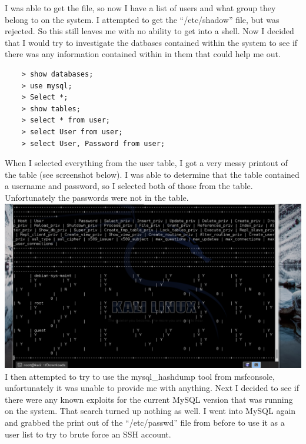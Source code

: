 \documentclass[12pt]{report}
\begin{document}
\newline
I was able to get the file, so now I have a list of users and what group they belong to on the system. I attempted to get the ``/etc/shadow'' file, but was rejected. So this still leaves me with no ability to get into a shell. Now I decided that I would try to investigate the datbases contained within the system to see if there was any information contained within in them that could help me out.
	\begin{verbatim}
	> show databases;
	> use mysql; 
	> Select *;
	> show tables;
	> select * from user;
	> select User from user;
	> select User, Password from user;
	\end{verbatim}
When I selected everything from the user table, I got a very messy printout of the table (see screenshot below). I was able to determine that the table contained a username and password, so I selected both of those from the table. Unfortunately the passwords were not in the table.\\
\includegraphics[scale=0.33, width=\linewidth]{weird_output.PNG}
\newline
I then attempted to try to use the mysql\_hashdump tool from msfconsole, unfortunately it was unable to provide me with anything. Next I decided to see if there were any known exploits for the current MySQL version that was running on the system. That search turned up nothing as well. I went into MySQL again and grabbed the print out of the ``/etc/passwd'' file from before to use it as a user list to try to brute force an SSH account.
\newline
\end{document}
